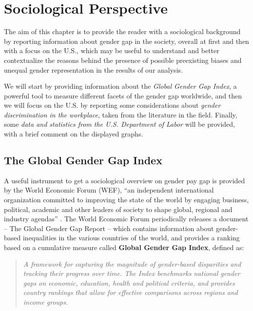 \chapter{Sociological Perspective}
\label{chapter:sociological_perspective}
\thispagestyle{empty}

The aim of this chapter is to provide the reader with a sociological background by reporting information about gender gap in the society, overall at first and then with a focus on the U.S., which may be useful to understand and better contextualize the reasons behind the presence of possible preexisting biases and unequal gender representation in the results of our analysis.

We will start by providing information about the \textit{Global Gender Gap Index}, a powerful tool to measure different facets of the gender gap worldwide, and then we will focus on the U.S. by reporting some considerations about \textit{gender discrimination in the workplace}, taken from the literature in the field. Finally, some \textit{data and statistics from the U.S. Department of Labor} will be provided, with a brief comment on the displayed graphs.


\section{The Global Gender Gap Index}
A useful instrument to get a sociological overview on gender pay gap is provided by the World Economic Forum (WEF), ``an independent international organization committed to improving the state of the world by engaging business, political, academic and other leaders of society to shape global, regional and industry agendas'' \cite{world2021terms}. The World Economic Forum periodically releases a document -- The Global Gender Gap Report -- which contains information about gender-based inequalities in the various countries of the world, and provides a ranking based on a cumulative measure called \textbf{Global Gender Gap Index}, defined as:
\begin{quote}\emph{A framework for capturing the magnitude of gender-based disparities and tracking their progress over time. The Index benchmarks national gender gaps on economic, education, health and political criteria, and provides country rankings that allow for effective comparisons across regions and income groups.} \cite[p.~3]{schwab2017global}\end{quote}

